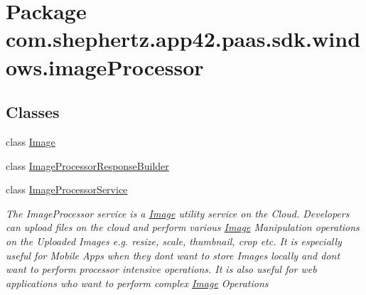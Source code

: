 \hypertarget{namespacecom_1_1shephertz_1_1app42_1_1paas_1_1sdk_1_1windows_1_1image_processor}{\section{Package com.\+shephertz.\+app42.\+paas.\+sdk.\+windows.\+image\+Processor}
\label{namespacecom_1_1shephertz_1_1app42_1_1paas_1_1sdk_1_1windows_1_1image_processor}
}
\subsection*{Classes}
\begin{DoxyCompactItemize}
\item 
class \hyperlink{classcom_1_1shephertz_1_1app42_1_1paas_1_1sdk_1_1windows_1_1image_processor_1_1_image}{Image}
\item 
class \hyperlink{classcom_1_1shephertz_1_1app42_1_1paas_1_1sdk_1_1windows_1_1image_processor_1_1_image_processor_response_builder}{Image\+Processor\+Response\+Builder}
\item 
class \hyperlink{classcom_1_1shephertz_1_1app42_1_1paas_1_1sdk_1_1windows_1_1image_processor_1_1_image_processor_service}{Image\+Processor\+Service}
\begin{DoxyCompactList}\small\item\em The Image\+Processor service is a \hyperlink{classcom_1_1shephertz_1_1app42_1_1paas_1_1sdk_1_1windows_1_1image_processor_1_1_image}{Image} utility service on the Cloud. Developers can upload files on the cloud and perform various \hyperlink{classcom_1_1shephertz_1_1app42_1_1paas_1_1sdk_1_1windows_1_1image_processor_1_1_image}{Image} Manipulation operations on the Uploaded Images e.\+g. resize, scale, thumbnail, crop etc. It is especially useful for Mobile Apps when they dont want to store Images locally and dont want to perform processor intensive operations. It is also useful for web applications who want to perform complex \hyperlink{classcom_1_1shephertz_1_1app42_1_1paas_1_1sdk_1_1windows_1_1image_processor_1_1_image}{Image} Operations \end{DoxyCompactList}\end{DoxyCompactItemize}
